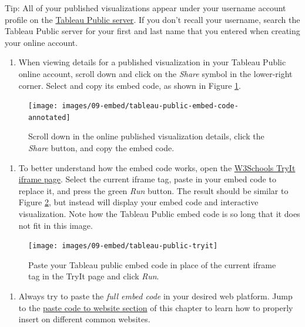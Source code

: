 \documentclass[
  english,
]{book}
\providecommand{\tightlist}{%
  \setlength{\itemsep}{0pt}\setlength{\parskip}{0pt}}
\begin{document}
Tip: All of your published visualizations appear under your username account profile on the \href{https://public.tableau.com}{Tableau Public server}. If you don't recall your username, search the Tableau Public server for your first and last name that you entered when creating your online account.

\begin{enumerate}
\def\labelenumi{\arabic{enumi}.}
\setcounter{enumi}{2}
\tightlist
\item
  When viewing details for a published visualization in your Tableau Public online account, scroll down and click on the \emph{Share} symbol in the lower-right corner. Select and copy its embed code, as shown in Figure \ref{fig:tableau-public-embed-code}.
\end{enumerate}



\begin{figure}
\texttt{[image: images/09-embed/tableau-public-embed-code-annotated]} \caption{Scroll down in the online published visualization details, click the \emph{Share} button, and copy the embed code.}\label{fig:tableau-public-embed-code}
\end{figure}

\begin{enumerate}
\def\labelenumi{\arabic{enumi}.}
\setcounter{enumi}{3}
\tightlist
\item
  To better understand how the embed code works, open the \href{https://www.w3schools.com/tags/tryit.asp?filename=tryhtml_iframe}{W3Schools TryIt iframe page}. Select the current iframe tag, paste in your embed code to replace it, and press the green \emph{Run} button. The result should be similar to Figure \ref{fig:tableau-public-tryit}, but instead will display your embed code and interactive visualization. Note how the Tableau Public embed code is so long that it does not fit in this image.
\end{enumerate}



\begin{figure}
\texttt{[image: images/09-embed/tableau-public-tryit]} \caption{Paste your Tableau public embed code in place of the current iframe tag in the TryIt page and click \emph{Run}.}\label{fig:tableau-public-tryit}
\end{figure}

\begin{enumerate}
\def\labelenumi{\arabic{enumi}.}
\setcounter{enumi}{4}
\tightlist
\item
  Always try to paste the \emph{full embed code} in your desired web platform. Jump to the \href{paste-code.html}{paste code to website section} of this chapter to learn how to properly insert on different common websites.
\end{enumerate}
\end{document}
